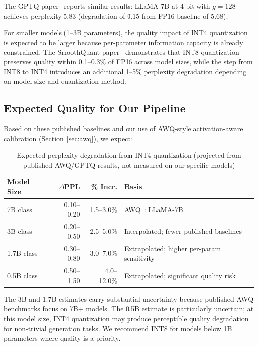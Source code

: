 \documentclass[12pt, letterpaper, twoside]{report}
\begin{document}
The GPTQ paper~\citep{frantar2022gptq} reports similar results: LLaMA-7B at 4-bit with $g = 128$ achieves perplexity 5.83 (degradation of 0.15 from FP16 baseline of 5.68).

For smaller models (1--3B parameters), the quality impact of INT4 quantization is expected to be larger because per-parameter information capacity is already constrained. The SmoothQuant paper~\citep{xiao2023smoothquant} demonstrates that INT8 quantization preserves quality within 0.1--0.3\% of FP16 across model sizes, while the step from INT8 to INT4 introduces an additional 1--5\% perplexity degradation depending on model size and quantization method.

\subsection{Expected Quality for Our Pipeline}
\label{subsec:expected_quality}

Based on these published baselines and our use of AWQ-style activation-aware calibration (Section~\ref{sec:awq}), we expect:

\begin{table}[H]
\centering
\caption{Expected perplexity degradation from INT4 quantization (projected from published AWQ/GPTQ results, not measured on our specific models)}
\label{tab:expected_quality}
{\small
\begin{tabular}{@{}lrrp{5.0cm}@{}}
\toprule
\textbf{Model Size} & \textbf{$\Delta$PPL} & \textbf{\% Incr.} & \textbf{Basis} \\
\midrule
7B class & 0.10--0.20 & 1.5--3.0\% & AWQ~\citep{lin2024awq}: LLaMA-7B \\[2pt]
3B class & 0.20--0.50 & 2.5--5.0\% & Interpolated; fewer published baselines \\[2pt]
1.7B class & 0.30--0.80 & 3.0--7.0\% & Extrapolated; higher per-param sensitivity \\[2pt]
0.5B class & 0.50--1.50 & 4.0--12.0\% & Extrapolated; significant quality risk \\
\bottomrule
\end{tabular}
}
\end{table}

The 3B and 1.7B estimates carry substantial uncertainty because published AWQ benchmarks focus on 7B+ models. The 0.5B estimate is particularly uncertain; at this model size, INT4 quantization may produce perceptible quality degradation for non-trivial generation tasks. We recommend INT8 for models below 1B parameters where quality is a priority.
\end{document}

